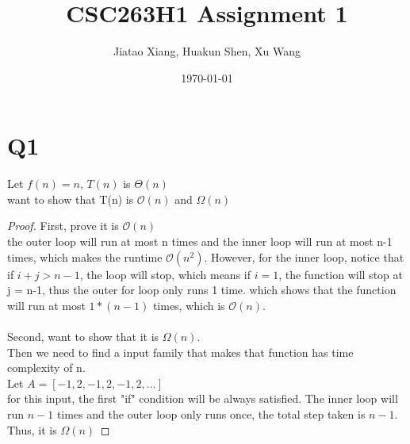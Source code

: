 \documentclass[11pt]{article}
\title{CSC263H1 Assignment 1}
\author{Jiatao Xiang,  Huakun Shen,  Xu Wang}
\date{\today}
\begin{document}
\maketitle
\section*{Q1}
Let $f(n) = n$, $T(n)$ is $\Theta(n)$ \\
want to show that T(n) is $\mathcal{O}(n)$ and $\Omega(n)$
\begin{proof}
First, prove it is $\mathcal{O}(n)$\\
the outer loop will run at most n times and the inner loop will run at most n-1 times, which makes the runtime $\mathcal{O}(n^2)$. However, 
for the inner loop, notice that if $i+j>n-1$, the loop will stop, which means if $i=1$, the function will stop at j = n-1, thus the outer for loop only runs 1 time. which shows that the function will run at most $1*(n-1)$ times, which is $\mathcal{O}(n)$.\\
\\
Second, want to show that it is $\Omega(n)$.\\
Then we need to find a input family that makes that function has time complexity of n.\\
Let $A = [-1 , 2,-1,2,-1,2, \dots]$\\
for this input, the first "if" condition will be always satisfied. The inner loop will run $n-1$ times and the outer loop only runs once, the total step taken is $n-1$. Thus, it is $\Omega(n)$
\end{proof}
\end{document}

